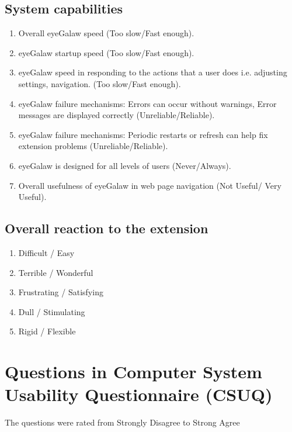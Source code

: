 \documentclass[journal]{./IEEE/IEEEtran}
\begin{document}
\subsection {System capabilities}
\begin{enumerate}
\item Overall eyeGalaw speed (Too slow/Fast enough).
\item eyeGalaw startup speed (Too slow/Fast enough).
\item eyeGalaw speed in responding to the actions that a user does i.e. adjusting settings, navigation. (Too slow/Fast enough).
\item eyeGalaw  failure mechanisms: Errors can occur without warnings, Error messages are displayed correctly (Unreliable/Reliable).
\item eyeGalaw  failure mechanisms: Periodic restarts or refresh can help fix extension problems (Unreliable/Reliable).
\item eyeGalaw is designed for all levels of users (Never/Always).
\item Overall usefulness of eyeGalaw in web page navigation (Not Useful/ Very Useful).
\end {enumerate}

\subsection {Overall reaction to the extension}
\begin{enumerate}
\item Difficult / Easy
\item Terrible / Wonderful
\item Frustrating / Satisfying 
\item  Dull / Stimulating 
\item Rigid / Flexible
\end {enumerate}

\section{Questions in  Computer System Usability Questionnaire (CSUQ)}
The questions were rated from Strongly Disagree to Strong Agree
\end{document}
